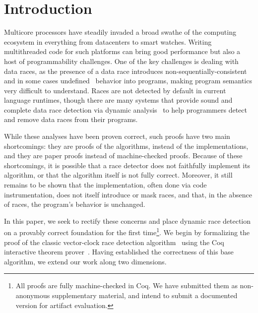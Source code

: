 \documentclass[preprint, 10pt]{sigplanconf}
\begin{document}


\section{Introduction}

Multicore processors have steadily invaded a broad swathe of the computing ecosystem in everything from datacenters to smart watches. Writing multithreaded code for such platforms can bring good performance but also a host of programmability challenges. One of the key challenges is dealing with data races, as the presence of a data race introduces non-sequentially-consistent~\cite{manson_java_2005} and in some cases undefined~\cite{boehm_foundations_2008} behavior into programs, making program semantics very difficult to understand. Races are not detected by default in current language runtimes, though there are many systems that provide sound and complete data race detection via dynamic analysis~\cite{djit+,fasttrack,slimstate} to help programmers detect and remove data races from their programs. 

While these analyses have been proven correct, such proofs have two main shortcomings: they are proofs of the algorithms, instead of the implementations, and they are paper proofs instead of machine-checked proofs. Because of these shortcomings, it is possible that a race detector does not faithfully implement its algorithm, or that the algorithm itself is not fully correct. Moreover, it still remains to be shown that the implementation, often done via code instrumentation, does not itself introduce or mask races, and that, in the absence of races, the program's behavior is unchanged.

In this paper, we seek to rectify these concerns and place dynamic race detection on a provably correct foundation for the first time\footnote{All proofs are fully machine-checked in Coq. We have submitted them as non-anonymous supplementary material, and intend to submit a documented version for artifact evaluation.}. We begin by formalizing the proof of the classic vector-clock race detection algorithm~\cite{vcfidge,vcmattern} using the Coq interactive theorem prover~\cite{coq}. Having established the correctness of this base algorithm, we extend our work along two dimensions. 
\end{document}
